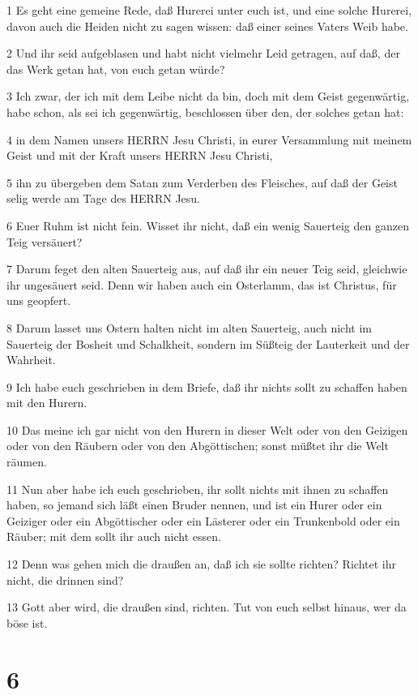 \par 1 Es geht eine gemeine Rede, daß Hurerei unter euch ist, und eine solche Hurerei, davon auch die Heiden nicht zu sagen wissen: daß einer seines Vaters Weib habe.
\par 2 Und ihr seid aufgeblasen und habt nicht vielmehr Leid getragen, auf daß, der das Werk getan hat, von euch getan würde?
\par 3 Ich zwar, der ich mit dem Leibe nicht da bin, doch mit dem Geist gegenwärtig, habe schon, als sei ich gegenwärtig, beschlossen über den, der solches getan hat:
\par 4 in dem Namen unsers HERRN Jesu Christi, in eurer Versammlung mit meinem Geist und mit der Kraft unsers HERRN Jesu Christi,
\par 5 ihn zu übergeben dem Satan zum Verderben des Fleisches, auf daß der Geist selig werde am Tage des HERRN Jesu.
\par 6 Euer Ruhm ist nicht fein. Wisset ihr nicht, daß ein wenig Sauerteig den ganzen Teig versäuert?
\par 7 Darum feget den alten Sauerteig aus, auf daß ihr ein neuer Teig seid, gleichwie ihr ungesäuert seid. Denn wir haben auch ein Osterlamm, das ist Christus, für uns geopfert.
\par 8 Darum lasset uns Ostern halten nicht im alten Sauerteig, auch nicht im Sauerteig der Bosheit und Schalkheit, sondern im Süßteig der Lauterkeit und der Wahrheit.
\par 9 Ich habe euch geschrieben in dem Briefe, daß ihr nichts sollt zu schaffen haben mit den Hurern.
\par 10 Das meine ich gar nicht von den Hurern in dieser Welt oder von den Geizigen oder von den Räubern oder von den Abgöttischen; sonst müßtet ihr die Welt räumen.
\par 11 Nun aber habe ich euch geschrieben, ihr sollt nichts mit ihnen zu schaffen haben, so jemand sich läßt einen Bruder nennen, und ist ein Hurer oder ein Geiziger oder ein Abgöttischer oder ein Lästerer oder ein Trunkenbold oder ein Räuber; mit dem sollt ihr auch nicht essen.
\par 12 Denn was gehen mich die draußen an, daß ich sie sollte richten? Richtet ihr nicht, die drinnen sind?
\par 13 Gott aber wird, die draußen sind, richten. Tut von euch selbst hinaus, wer da böse ist.

\chapter{6}


